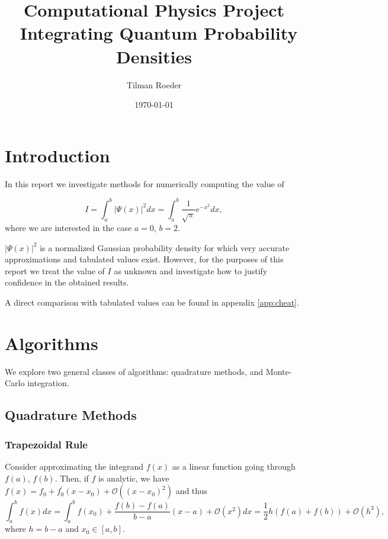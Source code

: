 \documentclass[10pt, a4paper]{article}
\title{Computational Physics Project \\ Integrating Quantum Probability Densities}
\author{Tilman Roeder}
\date{\today}
\begin{document}
\maketitle

\section{Introduction}
In this report we investigate methods for numerically computing the value of

\begin{equation}
\label{eq:target}
I = \int_a^b |\Psi(x)|^2 dx = \int_a^b \frac{1}{\sqrt{\pi}} e^{-x^2} dx,
\end{equation}
where we are interested in the case $a = 0$, $b = 2$.

$|\Psi(x)|^2$ is a normalized Gaussian probability density for which
very accurate approximations and tabulated values exist. However, for the purposes of this report we
treat the value of $I$ as unknown and investigate how to justify confidence in the
obtained results.

A direct comparison with tabulated values can be found in appendix \ref{app:cheat}.

\section{Algorithms}
\label{sec:algo}
We explore two general classes of algorithms: quadrature methods, and Monte-Carlo integration.

\subsection{Quadrature Methods}
  \subsubsection{Trapezoidal Rule}
  \label{sec:trap}
  Consider approximating the integrand $f(x)$ as a linear function going through $f(a)$, $f(b)$.
  Then, if $f$ is analytic, we have $f(x) = f_0 + f_0^\prime (x-x_0) + \mathcal{O}\left((x-x_0)^2\right)$
  and thus\footnotemark
  \begin{equation}
  \int_a^b f(x) dx =
  \int_a^b f(x_0) + \frac{f(b) - f(a)}{b-a} (x-a) + \mathcal{O}(x^2) dx =
  \frac{1}{2} h (f(a) + f(b)) + \mathcal{O}(h^3),
  \end{equation}
  where $h = b-a$ and $x_0 \in [a,b]$.

\end{document}
